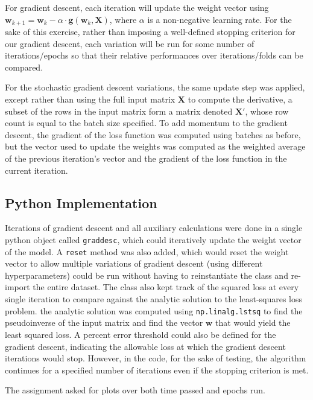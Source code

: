 \documentclass{article}
\begin{document}
For gradient descent, each iteration will update the weight vector using $\mathbf{w}_{k+1} = \mathbf{w}_{k} - \alpha \cdot \mathbf{g}(\mathbf{w}_{k}, \mathbf{X})$, where $\alpha$ is a non-negative learning rate. For the sake of this exercise, rather than imposing a well-defined stopping criterion for our gradient descent, each variation will be run for some number of iterations/epochs so that their relative performances over iterations/folds can be compared.

For the stochastic gradient descent variations, the same update step was applied, except rather than using the full input matrix $\mathbf{X}$ to compute the derivative, a subset of the rows in the input matrix form a matrix denoted $\mathbf{X'}$, whose row count is equal to the batch size specified. To add momentum to the gradient descent, the gradient of the loss function was computed using batches as before, but the vector used to update the weights was computed as the weighted average of the previous iteration's vector and the gradient of the loss function in the current iteration.

\subsection{Python Implementation}
Iterations of gradient descent and all auxiliary calculations were done in a single python object called \verb+graddesc+, which could iteratively update the weight vector of the model. A \verb+reset+ method was also added, which would reset the weight vector to allow multiple variations of gradient descent (using different hyperparameters) could be run without having to reinstantiate the class and re-import the entire dataset. The class also kept track of the squared loss at every single iteration to compare against the analytic solution to the least-squares loss problem. the analytic solution was computed using \verb+np.linalg.lstsq+ to find the pseudoinverse of the input matrix and find the vector $\mathbf{w}$ that would yield the least squared loss. A percent error threshold could also be defined for the gradient descent, indicating the allowable loss at which the gradient descent iterations would stop. However, in the code, for the sake of testing, the algorithm continues for a specified number of iterations even if the stopping criterion is met.

The assignment asked for plots over both time passed and epochs run.
\end{document}
